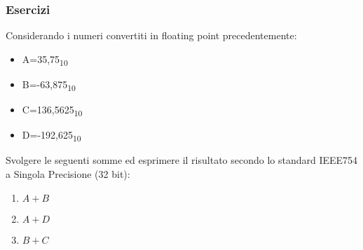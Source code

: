 \documentclass{article}
\begin{document}
\subsubsection{Esercizi}
Considerando i numeri convertiti in floating point precedentemente:
\begin{itemize}
    \item[] A=35,75\textsubscript{10}
    \item[] B=-63,875\textsubscript{10}
    \item[] C=136,5625\textsubscript{10}
    \item[] D=-192,625\textsubscript{10}
\end{itemize}
Svolgere le seguenti somme ed esprimere il risultato secondo lo standard IEEE754 a Singola Precisione (32 bit):
\begin{enumerate}
    \item $A + B$
    \item $A + D$
    \item $B + C$
\end{enumerate}
\end{document}
